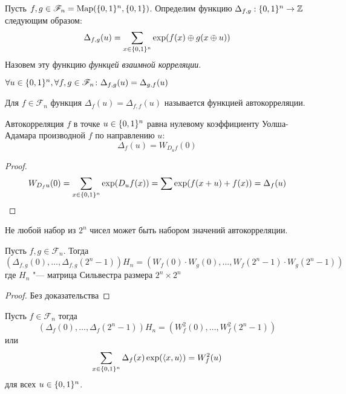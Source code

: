 \begin{definition}
Пусть $f,g \in \mathscr{F}_n = \operatorname*{Map}(\{0,1\}^n, \{0,1\})$. Определим функцию 
$\Delta_{f,g}: \{0,1\}^n \to \mathbb{Z}$ следующим образом:
$$\Delta_{f,g} (u) = \sum\limits_{x \in \{0,1\}^n} \exp (f(x) \oplus g(x \oplus u))$$
Назовем эту функцию \emph{функцей взаимной корреляции}.
\end{definition}

\begin{proposition}
$\forall u \in \{0,1\}^n, \forall f,g \in \mathscr{F}_n \colon 
   \Delta_{f,g} (u) = \Delta_{g,f} (u)$
\end{proposition}

\begin{definition}
Для $f \in \mathscr{F}_n$ функция $\Delta_f (u) = \Delta_{f,f} (u)$ называется
функцией автокорреляции.
\end{definition}

\begin{remark}
\label{autocor_derivative}
Автокорреляция $f$ в точке $u \in \{0,1\}^n$ равна нулевому коэффициенту
Уолша-Адамара производной $f$ по направлению $u$:
$$\Delta_f(u) = W_{D_u f} (0)$$
\end{remark}

\begin{proof}
$$W_{D_f u} (0) = \sum\limits_{x \in \{0,1\}^n} \exp (D_u f(x)) 
            = \sum\limits \exp (f(x+u) + f(x)) = \Delta_f (u)$$
\end{proof}

\begin{remark}
Не любой набор из $2^n$ чисел может быть набором значений
автокорреляции.
\end{remark}

\begin{theorem}
Пусть $f,g \in \mathscr{F}_n$. Тогда
  $$(\Delta_{f,g} (0), \ldots, \Delta_{f,g} (2^n - 1)) H_n =
     (W_f(0) \cdot W_g(0), \ldots, W_f(2^n -1) \cdot W_g(2^n-1))$$
 где $H_n$ "--- матрица Сильвестра размера $2^n \times 2^n$
\end{theorem}

\begin{proof}
Без доказательства
\end{proof}

\begin{corollary}
Пусть $f \in \mathscr{F}_n$ тогда 
$$(\Delta_f(0), \ldots, \Delta_f(2^n-1)) H_n = (W_f^2(0), \ldots, W_f^2 (2^n -1))$$
или
$$\sum\limits_{x \in \{0,1\}^n} \Delta_f(x) \exp(\langle x,u \rangle) = W_f^2(u)$$
для всех $u \in \{0,1\}^n$.
\end{corollary}

